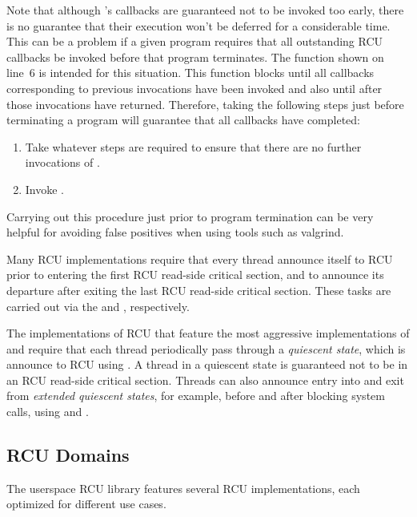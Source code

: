 \documentclass[letterpaper,twocolumn,10pt]{article}
\begin{document}
Note that although 's callbacks are guaranteed not to be
invoked too early, there is no guarantee that their execution won't be
deferred for a considerable time.
This can be a problem if a given program requires that all outstanding
RCU callbacks be invoked before that program terminates.
The  function shown on line~6 is intended for this
situation.
This function blocks until all callbacks corresponding to previous
 invocations have been invoked and also until after
those invocations have returned.
Therefore, taking the following steps just before terminating a program
will guarantee that all callbacks have completed:

\begin{enumerate}
\item	Take whatever steps are required to ensure that there are no
	further invocations of .
\item	Invoke .
\end{enumerate}

Carrying out this procedure just prior to program termination can be very
helpful for avoiding false positives when using tools such as valgrind.

Many RCU implementations require that every thread announce itself to
RCU prior to entering the first RCU read-side critical section, and
to announce its departure after exiting the last RCU read-side
critical section.
These tasks are carried out via the  and
, respectively.

The implementations of RCU that feature the most aggressive implementations of
 and  require that each thread
periodically pass through a \emph{quiescent state}, which is announce to RCU
using .
A thread in a quiescent state is guaranteed not to be in an RCU
read-side critical section.
Threads can also announce entry into and exit from \emph{extended
quiescent states}, for example, before and after blocking system
calls, using  and .

\subsection{RCU Domains}
\label{sec:RCU Domains}

The userspace RCU library features several RCU implementations, each
optimized for different use cases.
\end{document}
